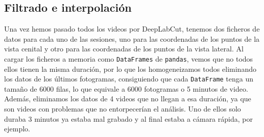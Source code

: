 \subsection{Filtrado e interpolación}
Una vez hemos pasado todos los videos por DeepLabCut, tenemos dos ficheros de datos para cada uno de las sesiones, uno para las coordenadas de los puntos de la vista cenital y otro para las coordenadas de los puntos de la vista lateral. Al cargar los ficheros a memoria como \texttt{DataFrames} de \texttt{pandas}, vemos que no todos ellos tienen la misma duración, por lo que los homogeneizamos todos eliminando los datos de los últimos fotogramas, consiguiendo que cada \texttt{DataFrame} tenga un tamaño de 6000 filas, lo que equivale a 6000 fotogramas o 5 minutos de video. Además, eliminamos los datos de 4 videos que no llegan a esa duración, ya que son videos con problemas que no entorpecerían el análisis. Uno de ellos solo duraba 3 minutos ya estaba mal grabado y al final estaba a cámara rápida, por ejemplo.


